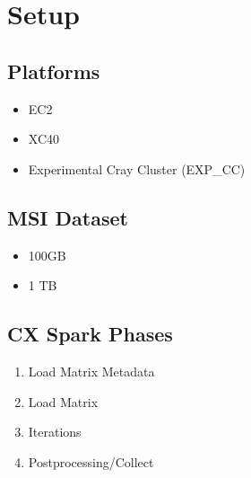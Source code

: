 \section{Setup}
\label{sec:setup}

\subsection{Platforms}
\begin{itemize}
  \item EC2
  \item XC40
  \item Experimental Cray Cluster (EXP\_CC)
\end{itemize}

\subsection{MSI Dataset}
\begin{itemize}
  \item 100GB
  \item 1 TB
\end{itemize}

\subsection{CX Spark Phases}
 \begin{enumerate}
      \item Load Matrix Metadata
      \item Load Matrix
      \item Iterations
      \item Postprocessing/Collect
 \end{enumerate}


